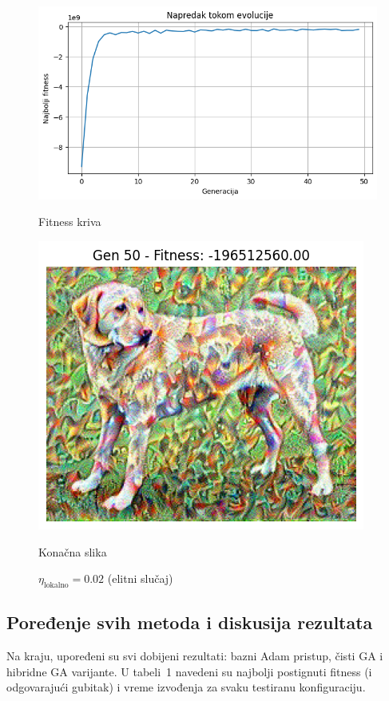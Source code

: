 \documentclass[a4paper,12pt]{article}
\begin{document}
\begin{figure}[h]
\centering
\begin{minipage}[b]{0.48\textwidth}
    \centering
    \includegraphics[width=\textwidth]{elite3gr.png} 
    \caption*{Fitness kriva}
\end{minipage}
\hfill
\begin{minipage}[b]{0.48\textwidth}
    \centering
    \includegraphics[width=\textwidth]{elite3.png} 
    \caption*{Konačna slika}
\end{minipage}
\caption{$\eta_{\text{lokalno}}=0.02$ (elitni slučaj)}
\end{figure}


\subsection{Poređenje svih metoda i diskusija rezultata}
Na kraju, upoređeni su svi dobijeni rezultati: bazni Adam pristup, čisti GA i hibridne GA varijante. U tabeli~1 navedeni su najbolji postignuti fitness (i odgovarajući gubitak) i vreme izvođenja za svaku testiranu konfiguraciju.
\end{document}
